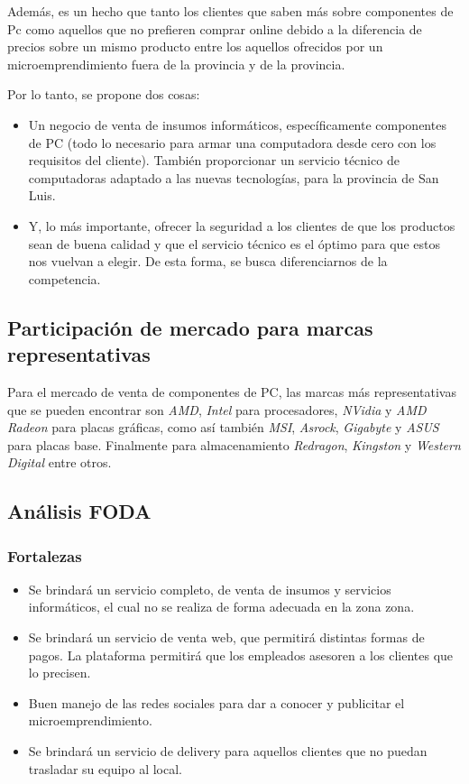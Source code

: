 \documentclass[11pt,a4paper]{article}
\begin{document}
Además, es un hecho que tanto los clientes que saben más sobre componentes de Pc como aquellos que no prefieren comprar online debido a la diferencia de precios sobre un mismo producto entre los aquellos ofrecidos por un microemprendimiento fuera de la provincia y de la provincia. 

Por lo tanto, se propone dos cosas:
\begin{itemize}
    \item Un negocio de venta de insumos informáticos, específicamente componentes de PC (todo lo necesario para armar una computadora desde cero con los requisitos del cliente). También proporcionar un servicio técnico de computadoras adaptado a las nuevas tecnologías, para la provincia de San Luis.
    \item Y, lo más importante, ofrecer la seguridad a los clientes de que los productos sean de buena calidad y que el servicio técnico es el óptimo para que estos nos vuelvan a elegir. De esta forma, se busca diferenciarnos de la competencia. 
\end{itemize}


\subsection{Participación de mercado para marcas representativas}

Para el mercado de venta de componentes de PC, las marcas más representativas que se pueden encontrar son \textit{AMD}, \textit{Intel} para procesadores, \textit{NVidia} y \textit{AMD Radeon} para placas gráficas, como así también \textit{MSI}, \textit{Asrock}, \textit{Gigabyte} y \textit{ASUS} para placas base. Finalmente para almacenamiento \textit{Redragon}, \textit{Kingston} y \textit{Western Digital} entre otros. 

\subsection{Análisis FODA} 
\subsubsection{Fortalezas} 
\begin{itemize}
    \item Se brindará un servicio completo, de venta de insumos y servicios informáticos, el cual no se realiza de forma adecuada en la zona zona.
    \item Se brindará un servicio de venta web, que permitirá distintas formas de pagos. La plataforma permitirá que los empleados asesoren a los clientes que lo precisen.
    \item Buen manejo de las redes sociales para dar a conocer y publicitar el microemprendimiento.
    \item Se brindará un servicio de delivery para aquellos clientes que no puedan trasladar su equipo al local.
\end{itemize}
\end{document}
